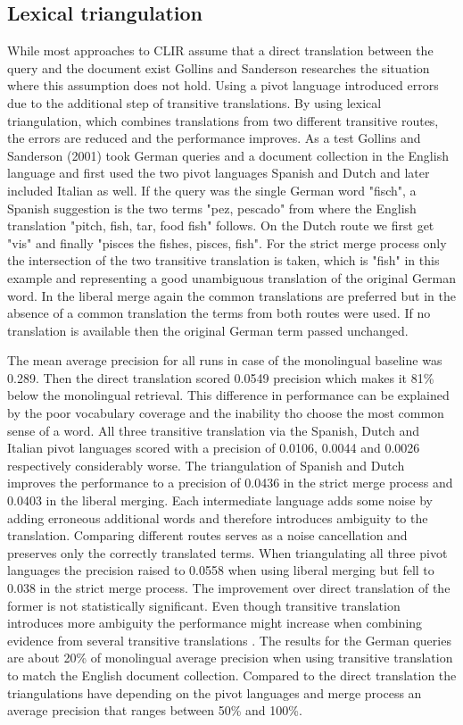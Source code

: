 \documentclass[journal]{IEEEtran}
\begin{document}
\subsection{Lexical triangulation}
While most approaches to CLIR assume that a direct translation between the query and the document exist Gollins and Sanderson \cite{gollins01} researches the situation where this assumption does not hold.
Using a pivot language introduced errors due to the additional step of transitive translations.
By using lexical triangulation, which combines translations from two different transitive routes, the errors are reduced and the performance improves.
As a test Gollins and Sanderson (2001) took German queries and a document collection in the English language and first used the two pivot languages Spanish and Dutch and later included Italian as well.
If the query was the single German word "fisch", a Spanish suggestion is the two terms "pez, pescado" from where the English translation "pitch, fish, tar, food fish" follows.
On the Dutch route we first get "vis" and finally "pisces the fishes, pisces, fish".
For the strict merge process only the intersection of the two transitive translation is taken, which is "fish" in this example and representing a good unambiguous translation of the original German word.
In the liberal merge again the common translations are preferred but in the absence of a common translation the terms from both routes were used.
If no translation is available then the original German term passed unchanged.

The mean average precision for all runs in case of the monolingual baseline was 0.289.
Then the direct translation scored 0.0549 precision which makes it 81\% below the monolingual retrieval.
This difference in performance can be explained by the poor vocabulary coverage and the inability tho choose the most common sense of a word.
All three transitive translation via the Spanish, Dutch and Italian pivot languages scored with a precision of 0.0106, 0.0044 and 0.0026 respectively considerably worse.
The triangulation of Spanish and Dutch improves the performance to a precision of 0.0436 in the strict merge process and 0.0403 in the liberal merging.
Each intermediate language adds some noise by adding erroneous additional words and therefore introduces ambiguity to the translation.
Comparing different routes serves as a noise cancellation and preserves only the correctly translated terms.
When triangulating all three pivot languages the precision raised to 0.0558 when using liberal merging but fell to 0.038 in the strict merge process.
The improvement over direct translation of the former is not statistically significant.
Even though transitive translation introduces more ambiguity the performance might increase when combining evidence from several transitive translations \cite{ballesteros00}.
The results for the German queries are about 20\% of monolingual average precision when using transitive translation to match the English document collection.
Compared to the direct translation the triangulations have depending on the pivot languages and merge process an average precision that ranges between 50\% and 100\%.
\end{document}
